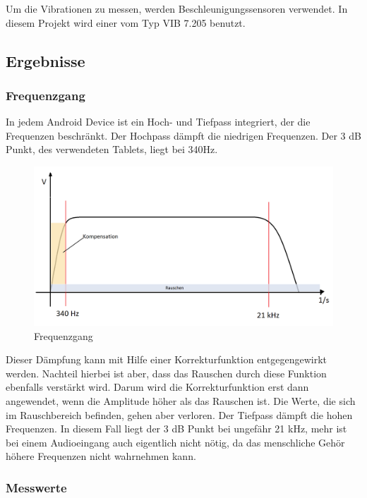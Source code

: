 \documentclass{article}
\begin{document}
{			Um die Vibrationen zu messen, werden Beschleunigungssensoren verwendet. In diesem Projekt wird einer vom Typ VIB 7.205 benutzt.

	\subsection{Ergebnisse}
		\subsubsection{Frequenzgang}

				In jedem Android Device ist ein Hoch- und Tiefpass integriert, der die Frequenzen beschränkt.
				Der Hochpass dämpft die niedrigen Frequenzen. Der 3 dB Punkt, des verwendeten Tablets, liegt bei 340Hz. 

				\begin{figure}
					\includegraphics[scale=0.2]{Bilder/Frequenzgang.png}
					\centering
					\vspace{0 cm}
					\caption{Frequenzgang}
					\label{fig3}	
				\end{figure}

				Dieser Dämpfung kann mit Hilfe einer Korrekturfunktion entgegengewirkt werden. Nachteil hierbei ist aber, dass das Rauschen durch diese Funktion ebenfalls verstärkt wird. Darum wird die Korrekturfunktion erst dann angewendet, wenn die Amplitude höher als das Rauschen ist. Die Werte, die sich im Rauschbereich befinden, gehen aber verloren.
				Der Tiefpass dämpft die hohen Frequenzen. In diesem Fall liegt der 3 dB Punkt bei ungefähr 21 kHz, mehr ist bei einem Audioeingang auch eigentlich nicht nötig, da das menschliche Gehör höhere Frequenzen nicht wahrnehmen kann.


		\subsubsection{Messwerte}

}
\end{document}
